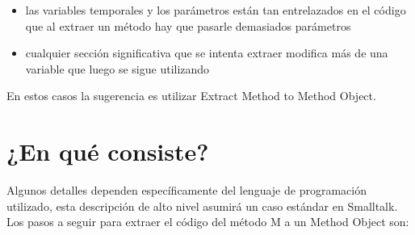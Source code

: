 \begin{itemize}
    \item las variables temporales y los parámetros están tan entrelazados en el
      código que al extraer un método hay que pasarle demasiados parámetros
    \item cualquier sección significativa que se intenta extraer modifica más de
      una variable que luego se sigue utilizando
\end{itemize}

En estos casos la sugerencia es utilizar Extract Method to Method Object.


\section{¿En qué consiste?}

Algunos detalles dependen específicamente del lenguaje de programación
utilizado, esta descripción de alto nivel asumirá un caso estándar en
Smalltalk. Los pasos a seguir para extraer el código del método M a un Method
Object son:

